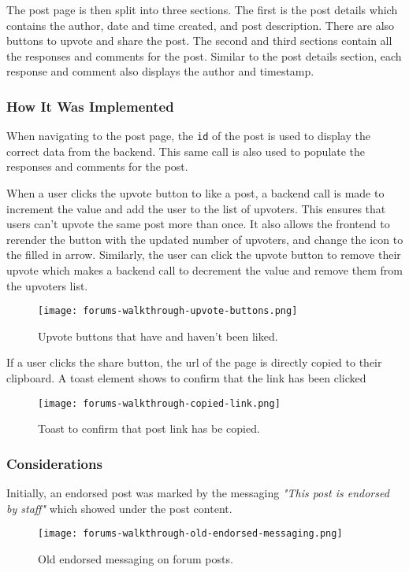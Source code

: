 The post page is then split into three sections.
The first is the post details which contains the author, date and time created, and post description.
There are also buttons to upvote and share the post.
The second and third sections contain all the responses and comments for the post.
Similar to the post details section, each response and comment also displays the author and timestamp.

\subsubsection{How It Was Implemented}
When navigating to the post page, the \texttt{id} of the post is used to display the correct data from the backend.
This same call is also used to populate the responses and comments for the post.

When a user clicks the upvote button to like a post, a backend call is made to increment the value and add the user to the list of upvoters.
This ensures that users can't upvote the same post more than once.
It also allows the frontend to rerender the button with the updated number of upvoters, and change the icon to the filled in arrow.
Similarly, the user can click the upvote button to remove their upvote which makes a backend call to decrement the value and remove them from the upvoters list.

\begin{figure}[h!]
    \texttt{[image: forums-walkthrough-upvote-buttons.png]}
    \centering
    \caption{Upvote buttons that have and haven't been liked.}
\end{figure}

If a user clicks the share button, the url of the page is directly copied to their clipboard.
A toast element shows to confirm that the link has been clicked

\begin{figure}[h!]
    \texttt{[image: forums-walkthrough-copied-link.png]}
    \centering
    \caption{Toast to confirm that post link has be copied.}
\end{figure}

\subsubsection{Considerations}
Initially, an endorsed post was marked by the messaging \textit{"This post is endorsed by staff"} which showed under the post content.

\begin{figure}[h!]
    \texttt{[image: forums-walkthrough-old-endorsed-messaging.png]}
    \centering
    \caption{Old endorsed messaging on forum posts.}
\end{figure}

